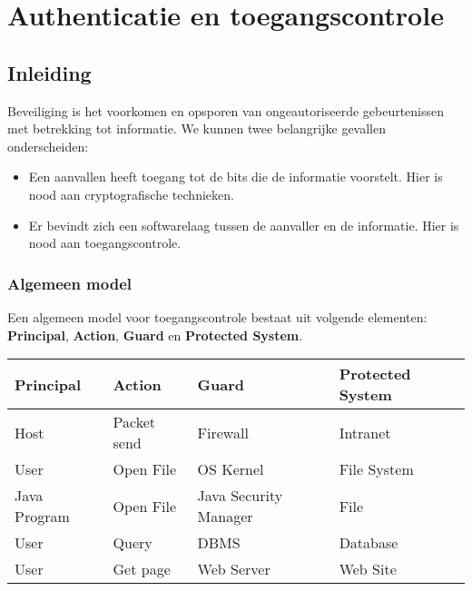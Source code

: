 \documentclass[../main.tex]{subfiles}
\begin{document}
\chapter{Authenticatie en toegangscontrole}

\section{Inleiding}
Beveiliging is het voorkomen en opsporen van ongeautoriseerde gebeurtenissen met betrekking tot informatie. We kunnen twee belangrijke gevallen onderscheiden:
\begin{itemize}
	\item Een aanvallen heeft toegang tot de bits die de informatie voorstelt. Hier is nood aan cryptografische technieken.
	\item Er bevindt zich een softwarelaag tussen de aanvaller en de informatie. Hier is nood aan toegangscontrole. 
\end{itemize} 

\subsection{Algemeen model}
Een algemeen model voor toegangscontrole bestaat uit volgende elementen: \textbf{Principal}, \textbf{Action}, \textbf{Guard} en \textbf{Protected System}.

\begin{center}
\begin{tabular}{|l|l|l|l|}
\hline 
\textbf{Principal} & \textbf{Action} & \textbf{Guard} & \textbf{Protected System} \\ 
\hline 
Host & Packet send & Firewall & Intranet \\ 
\hline 
User & Open File & OS Kernel & File System \\ 
\hline 
Java Program & Open File & Java Security Manager & File \\ 
\hline 
User & Query & DBMS & Database \\ 
\hline 
User & Get page & Web Server  & Web Site \\ 
\hline 
\end{tabular} 
\end{center}
\end{document}
